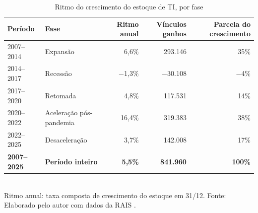 \begin{table}[htbp]
    \centering
    \caption{Ritmo do crescimento do estoque de TI, por fase}
    \label{tab:fases}
    \footnotesize
    \renewcommand{\arraystretch}{1.25}
    \begin{tabular}{llrrr}
        \toprule
        \rowcolor{black!8}
        \textbf{Período} & \textbf{Fase} & \textbf{Ritmo anual} & \textbf{Vínculos ganhos} & \textbf{Parcela do crescimento} \\
        \midrule
        2007--2014 & Expansão & 6,6\% & 293.146 & 35\% \\
        2014--2017 & Recessão & $-$1,3\% & $-$30.108 & $-$4\% \\
        2017--2020 & Retomada & 4,8\% & 117.531 & 14\% \\
        2020--2022 & Aceleração pós-pandemia & 16,4\% & 319.383 & 38\% \\
        2022--2025 & Desaceleração & 3,7\% & 142.008 & 17\% \\
        \textbf{2007--2025} & \textbf{Período inteiro} & \textbf{5,5\%} & \textbf{841.960} & \textbf{100\%} \\
        \bottomrule
    \end{tabular}
    \\[4pt]
    Ritmo anual: taxa composta de crescimento do estoque em 31/12. Fonte: Elaborado pelo autor com dados da RAIS \cite{RAIS2024}.
\end{table}
